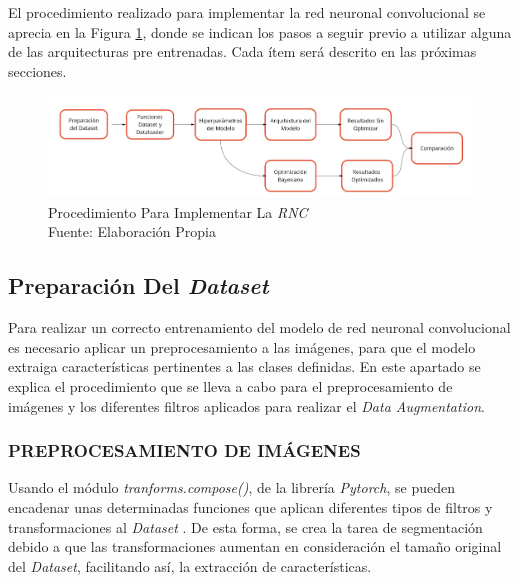 \vspace{0.5cm}

El procedimiento realizado para implementar la red neuronal convolucional se aprecia en la Figura \ref{fig:procedimiento}, donde se indican los pasos a seguir previo a utilizar alguna de las arquitecturas pre entrenadas. Cada ítem será descrito en las próximas secciones.  

\newpage
\begin{figure}[ht]
	\centering
	\includegraphics[scale=0.4]{Figs/procedimiento.jpg}
	\caption{Procedimiento Para Implementar La \textit{RNC} \\ Fuente: Elaboración Propia}
	\label{fig:procedimiento}
\end{figure}	

\subsection{Preparación Del \textit{Dataset}}

Para realizar un correcto entrenamiento del modelo de red neuronal convolucional es necesario aplicar un preprocesamiento a las imágenes, para que el modelo extraiga características pertinentes a las clases definidas. En este apartado se explica el procedimiento que se lleva a cabo para el preprocesamiento de imágenes y los diferentes filtros aplicados para realizar el \textit{Data Augmentation}.

\subsubsection{PREPROCESAMIENTO DE IMÁGENES}

Usando el módulo \textit{tranforms.compose()}, de la librería \textit{Pytorch}, se pueden encadenar unas determinadas funciones que aplican diferentes tipos de filtros y transformaciones al \textit{Dataset} \cite{Pytorch}. De esta forma, se crea la tarea de segmentación debido a que las transformaciones aumentan en consideración el tamaño original del \textit{Dataset}, facilitando así, la extracción de características.\\

